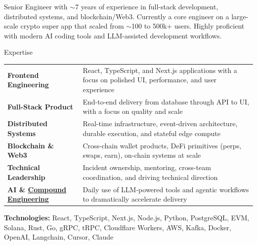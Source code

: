 \documentclass{resume} %
\begin{document}
\begin{center}
Senior Engineer with $\sim$7 years of experience in full-stack development, distributed systems, and blockchain/Web3. Currently a core engineer on a large-scale crypto super app that scaled from $\sim$100 to 500k+ users. Highly proficient with modern AI coding tools and LLM-assisted development workflows.
    
\end{center}


\begin{rSection}{Expertise}

\begin{tabular}{ @{} >{\bfseries}l @{\hspace{6ex}} p{} }
Frontend Engineering & React, TypeScript, and Next.js applications with a focus on polished UI, performance, and user experience \\
Full-Stack Product & End-to-end delivery from database through API to UI, with a focus on quality and scale \\
Distributed Systems & Real-time infrastructure, event-driven architecture, durable execution, and stateful edge compute \\
Blockchain \& Web3 & Cross-chain wallet products, DeFi primitives (perps, swaps, earn), on-chain systems at scale \\
Technical Leadership & Incident ownership, mentoring, cross-team coordination, and driving technical direction \\
AI \& \href{https://every.to/guides/compound-engineering}{Compound Engineering} & Daily use of LLM-powered tools and agentic workflows to dramatically accelerate delivery \\
\end{tabular}

\vspace{4pt}
\textbf{Technologies:} React, TypeScript, Next.js, Node.js, Python, PostgreSQL, EVM, Solana, Rust, Go, gRPC, tRPC, Cloudflare Workers, AWS, Kafka, Docker, OpenAI, Langchain, Cursor, Claude

\end{rSection}
\end{document}
